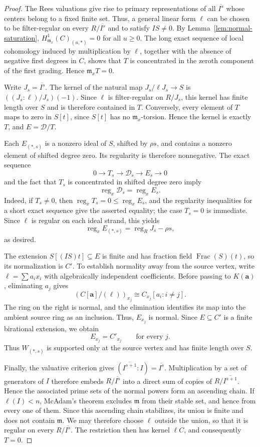\documentclass[12pt]{amsart}
\numberwithin{equation}{section}
\theoremstyle{definition}
\theoremstyle{remark}
\numberwithin{equation}{section}
\DeclareMathOperator{\reg}{reg}
\begin{document}
\begin{proof}
The Rees valuations give rise to primary representations of all $\overline{I^s}$ whose centers belong to a fixed finite set. Thus, a general linear form $\ell$ can be chosen to be filter-regular on every $R/\overline{I^s}$ and  to satisfy $IS\ne0$. By Lemma~\ref{lem:normal-saturation}, 
$H^1_{\mathfrak m_x}(C)_{(u,*)}=0$ for all $u\ge0$. The long exact sequence of local cohomology induced by multiplication by $\ell$, together with the absence of negative first degrees in $C$, shows that $T$ is concentrated in the zeroth component of the first grading. Hence $\mathfrak m_xT=0$.

	Write $J_s=\overline{I^s}$. The kernel of the natural map $J_s/\ell J_s\to S$ is $((J_s:\ell)/J_s)(-1)$.
Since $\ell$ is filter-regular on $R/J_s$, this kernel has finite length over $S$ and is therefore contained in $T$. Conversely, every element of $T$ maps to zero in $S[t]$, since $S[t]$ has no $\mathfrak m_x$-torsion. Hence the kernel is exactly $T$, and $E=\mathcal D/T$.
	
	Each $E_{(*,s)}$ is a nonzero ideal of $S$, shifted by $\rho s$, and contains a nonzero element of shifted degree zero. Its regularity is therefore nonnegative. The exact sequence
	\[
	0\longrightarrow T_s\longrightarrow\mathcal D_s\longrightarrow E_s\longrightarrow0
	\]
	and the fact that $T_s$ is concentrated in shifted degree zero imply
	\[
	\reg_x\mathcal D_s=\reg_xE_s.
	\]
	Indeed, if $T_s\ne0$, then $\reg_xT_s=0\le\reg_xE_s$, and the regularity inequalities for a
	short exact sequence give the asserted equality; the case $T_s=0$ is immediate.
	Since $\ell$ is regular on each ideal strand, this yields
	\[
	\reg_xE_{(*,s)}=\reg_R J_s-\rho s,
	\]
	as desired.
	
	The extension $S[(IS)t]\subseteq E$ is finite and has fraction field $\operatorname{Frac}(S)(t)$, so its normalization is $C'$.
	To establish normality away from the source vertex, write $\ell=\sum a_ix_i$ with algebraically independent coefficients.
	Before passing to $K(\mathbf a)$, eliminating $a_j$ gives
	\[
	(C[\mathbf a]/(\ell))_{x_j}
	\cong C_{x_j}[a_i:i\ne j].
	\]
	The ring on the right is normal, and the elimination identifies its map into the ambient source ring as an inclusion.
Thus, $E_{x_j}$ is normal. Since $E\subseteq C'$ is a finite birational extension, we obtain
	\[
	E_{x_j}=C'_{x_j} \qquad\text{for every }j.
	\]
	Thus $W_{(*,s)}$ is supported only at the source vertex and has finite length over $S$.
	
		Finally, the valuative criterion gives   $(\overline{I^{s+1}}:I)=\overline{I^s}$.
	Multiplication by a set of generators of $I$ therefore embeds $R/\overline{I^s}$ into a direct sum of copies of
	$R/\overline{I^{s+1}}$. Hence the associated prime sets of the normal powers form an ascending chain. If $\ell(I)<n$, McAdam's theorem
	\cite[Theorem~5.4.6]{HS} excludes $\mathfrak m$ from their stable set, and hence from every one of them. Since this ascending chain stabilizes, its union is finite and does not contain $\mathfrak m$. We may therefore choose $\ell$ outside the union, so that it is regular on every $R/\overline{I^s}$.
	 The restriction then has kernel $\ell C$, and consequently $T=0$.
\end{proof}
\end{document}
